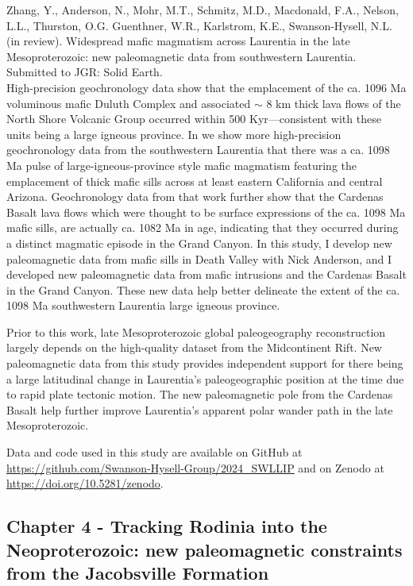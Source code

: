 \documentclass{ucbthesis}
\begin{document}
\begin{frontmatter}
\noindent Zhang, Y., Anderson, N., Mohr, M.T., Schmitz, M.D., Macdonald, F.A., Nelson, L.L., Thurston, O.G. Guenthner, W.R., Karlstrom, K.E., Swanson-Hysell, N.L. (in review). Widespread mafic magmatism across Laurentia in the late Mesoproterozoic: new paleomagnetic data from southwestern Laurentia. Submitted to JGR: Solid Earth. 
\\

High-precision geochronology data show that the emplacement of the ca. 1096 Ma voluminous mafic Duluth Complex and associated $\sim$ 8 km thick lava flows of the North Shore Volcanic Group occurred within 500 Kyr---consistent with these units being a large igneous province. In \cite{Mohr2024a} we show more high-precision geochronology data from the southwestern Laurentia that there was a ca. 1098 Ma pulse of large-igneous-province style mafic magmatism featuring the emplacement of thick mafic sills across at least eastern California and central Arizona. Geochronology data from that work further show that the Cardenas Basalt lava flows which were thought to be surface expressions of the ca. 1098 Ma mafic sills, are actually ca. 1082 Ma in age, indicating that they occurred during a distinct magmatic episode in the Grand Canyon. In this study, I develop new paleomagnetic data from mafic sills in Death Valley with Nick Anderson, and I developed new paleomagnetic data from mafic intrusions and the Cardenas Basalt in the Grand Canyon. These new data help better delineate the extent of the ca. 1098 Ma southwestern Laurentia large igneous province.

Prior to this work, late Mesoproterozoic global paleogeography reconstruction largely depends on the high-quality dataset from the Midcontinent Rift. New paleomagnetic data from this study provides independent support for there being a large latitudinal change in Laurentia's paleogeographic position at the time due to rapid plate tectonic motion. The new paleomagnetic pole from the Cardenas Basalt help further improve Laurentia's apparent polar wander path in the late Mesoproterozoic.

Data and code used in this study are available on GitHub at \url{https://github.com/Swanson-Hysell-Group/2024_SWLLIP} and on Zenodo at \url{https://doi.org/10.5281/zenodo}.

\subsection{Chapter 4 - Tracking Rodinia into the Neoproterozoic: new paleomagnetic constraints from the Jacobsville Formation}


\end{frontmatter}
\end{document}
